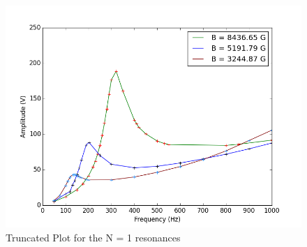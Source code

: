 \begin{figure}[H]
    \begin{center}
    \includegraphics[scale=0.46]{N1_resonance_plot_notitle.png}
    \caption{Truncated Plot for the N = 1 resonances}
    \label{fig:N1_resonance_plot}
    \end{center}
\end{figure}

